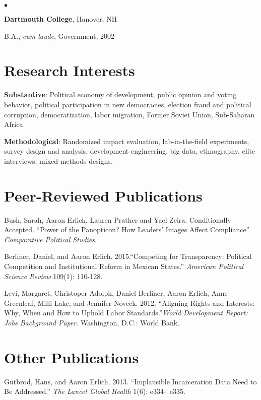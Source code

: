 \documentclass[margin,line]{res}
\newenvironment{list1}{
  \begin{list}{\ding{113}}{%
      \setlength{\itemsep}{0in}
      \setlength{\parsep}{0in} \setlength{\parskip}{0in}
      \setlength{\topsep}{0in} \setlength{\partopsep}{0in} 
      \setlength{\leftmargin}{0.17in}}}{\end{list}}
\newenvironment{list2}{
  \begin{list}{$\bullet$}{%
      \setlength{\itemsep}{0in}
      \setlength{\parsep}{0in} \setlength{\parskip}{0in}
      \setlength{\topsep}{0in} \setlength{\partopsep}{0in} 
      \setlength{\leftmargin}{0.2in}}}{\end{list}}
\begin{document}
{\begin{resume}
\begin{list1}
\begin{list2}
\end{list2}
\end{list1}

{\bf Dartmouth College}, Hanover, NH\\
\vspace*{-.1in}
\begin{list1}
\item[] B.A., \emph{cum laude}, Government,  2002
\end{list1}


\section{\sc Research Interests}
\textbf{Substantive}: Political economy of development, public opinion
and voting behavior, political participation in new
democracies, election fraud and
political corruption, democratization,  labor migration, Former Soviet
Union, Sub-Saharan Africa.

\textbf{Methodological}: Randomized impact evaluation,
lab-in-the-field experiments, survey design and analysis, development engineering, big data,  ethnography, elite
interviews, mixed-methods designs.

\section{\sc Peer-Reviewed Publications}

Bush, Sarah, Aaron Erlich, Lauren Prather and Yael
Zeira. Conditionally Accepted. ``Power of the Panopticon? How Leaders’ Images Affect Compliance''
\emph{Comparative Political Studies}.

Berliner, Daniel,  and Aaron Erlich. 2015.``Competing for
Transparency: Political Competition and Institutional Reform in
Mexican States.'' \emph{American Political Science Review} 109(1): 110-128.

Levi, Margaret, Christoper Adolph, Daniel Berliner, Aaron Erlich, Anne
Greenleaf, Milli Lake, and Jennifer Noveck. 2012. ``Aligning Rights and
Interests: Why, When and How to Uphold Labor Standards.''\emph{World
  Development Report: Jobs Background Paper}. Washington, D.C.: World
Bank.


\section{\sc  Other Publications}
Gutbrod, Hans, and Aaron Erlich. 2013. ``Implausible Incarceration
Data Need to Be Addressed.'' \emph{The Lancet Global Health} 1(6):
e334-- e335.


\end{resume}}
\end{document}
